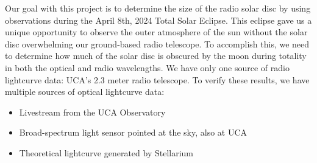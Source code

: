 Our goal with this project is to determine the size of the radio solar disc by using observations during the April 8th, 2024 Total Solar Eclipse.
This eclipse gave us a unique opportunity to observe the outer atmosphere of the sun without the solar disc overwhelming our ground-based radio telescope. %
To accomplish this, we need to determine how much of the solar disc is obscured by the moon during totality in both the optical and radio wavelengths.
We have only one source of radio lightcurve data: UCA's 2.3 meter radio telescope.
To verify these results, we have multiple sources of optical lightcurve data:
\begin{itemize}
    \item Livestream from the UCA Observatory
    \item Broad-spectrum light sensor pointed at the sky, also at UCA
    \item Theoretical lightcurve generated by Stellarium
\end{itemize}%